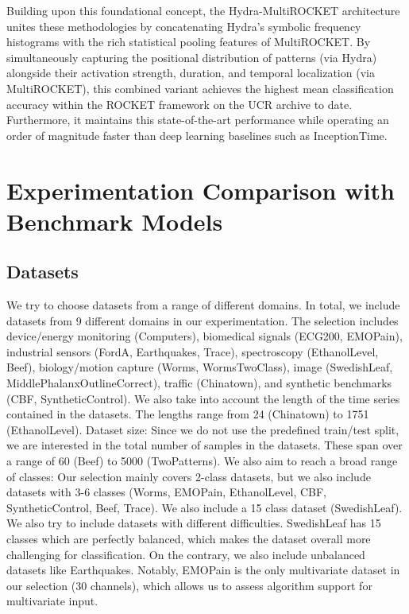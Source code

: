 \documentclass[conference]{IEEEtran}
\begin{document}
Building upon this foundational concept, the Hydra-MultiROCKET architecture unites these methodologies by concatenating Hydra’s symbolic frequency histograms with the rich statistical pooling features of MultiROCKET. By simultaneously capturing the positional distribution of patterns (via Hydra) alongside their activation strength, duration, and temporal localization (via MultiROCKET), this combined variant achieves the highest mean classification accuracy within the ROCKET framework on the UCR archive to date. Furthermore, it maintains this state-of-the-art performance while operating an order of magnitude faster than deep learning baselines such as InceptionTime.

\section{Experimentation Comparison with Benchmark Models}
\subsection{Datasets}
We try to choose datasets from a range of different domains. In total, we include datasets from 9 different domains in our experimentation. The selection includes device/energy monitoring (Computers), biomedical signals (ECG200, EMOPain), industrial sensors (FordA, Earthquakes, Trace), spectroscopy (EthanolLevel, Beef), biology/motion capture (Worms, WormsTwoClass), image (SwedishLeaf, MiddlePhalanxOutlineCorrect), traffic (Chinatown), and synthetic benchmarks (CBF, SyntheticControl). We also take into account the length of the time series contained in the datasets. The lengths range from 24 (Chinatown) to 1751 (EthanolLevel). Dataset size: Since we do not use the predefined train/test split, we are interested in the total number of samples in the datasets. These span over a range of 60 (Beef) to 5000 (TwoPatterns). We also aim to reach a broad range of classes: Our selection mainly covers 2-class datasets, but we also include datasets with 3-6 classes (Worms, EMOPain, EthanolLevel, CBF, SyntheticControl, Beef, Trace). We also include a 15 class dataset (SwedishLeaf). We also try to include datasets with different difficulties. SwedishLeaf has 15 classes which are perfectly balanced, which makes the dataset overall more challenging for classification. On the contrary, we also include unbalanced datasets like Earthquakes. Notably, EMOPain is the only multivariate dataset in our selection (30 channels), which allows us to assess algorithm support for multivariate input.
\end{document}
